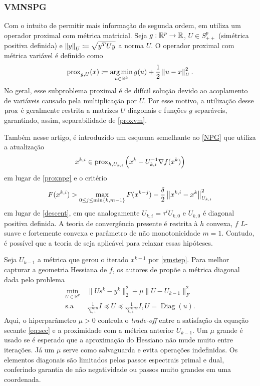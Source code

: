 \subsubsection{VMNSPG}
Com o intuito de permitir mais informação de segunda ordem, em \cite{vmspg} utiliza um operador proximal com métrica matricial. Seja $g:\mathbb{R}^p\to\mathbb{R}$, $U\in S^p_{++}$ (simétrica positiva definida) e $\left\| y \right\|_U\coloneqq\sqrt{y^TUy}$ a norma $U$. O operador proximal com métrica variável é definido como
\begin{equation}
    \label{proxvm}
        \operatorname{prox}_{g,U}(x)\coloneqq\operatorname*{arg\,min}_{u\in\mathbb{R}^k}g(u)+ \frac{1}{2}\left\| u-x \right\|_U^2 . 
\end{equation} 
No geral, esse subproblema proximal é de difícil solução devido ao acoplamento de variáveis causado pela multiplicação por $U$. Por esse motivo, a utilização desse $\operatorname{prox}$ é geralmente restrita a matrizes $U$ diagonais e funções $g$ separáveis, garantindo, assim, separabilidade de \eqref{proxvm}. 

Também nesse artigo, é introduzido um esquema semelhante ao \autoref{NPG} que utiliza a atualização
\begin{equation}
x^{k,i}\in \operatorname{prox}_{h,U_{k,i}}\left(x^k-U_{k,i}^{-1}\nabla f(x^k)\right)\label{vmstep}
\end{equation}            
em lugar de \eqref{proxnpg} e o critério
\[
F(x^{k,i})> \max_{0\leq j \leq \min\{k, m-1\}}F(x^{k-j})-\frac{\delta}{2}\left\| x^{k,i}-x^k \right\|_{U_{k,i}}^2\]
em lugar de \eqref{descent}, em que analogamente $U_{k,i}=\tau^i U_{k,0}$ e $U_{k,0}$ é diagonal positiva definida. A teoria de convergência presente é restrita à $h$ convexa, $f$ $L$-suave e fortemente convexa e parâmetro de não monotonicidade $m=1$. Contudo, é possível que a teoria de \cite{kanzow2021} seja aplicável para relaxar essas hipóteses.

Seja $U_{k-1}$ a métrica que gerou o iterado $x^{k-1}$ por \eqref{vmstep}. Para melhor capturar a geometria Hessiana de $f$, os autores de \cite{vmspg} propõe a métrica diagonal dada pelo problema
\begin{equation}
\begin{aligned}
\min_{U \in \mathbb{R}^p}\ & 
    \|U s^k - y^k\|_2^2 + \mu \|U - U_{k-1}\|_F^2 \\
\text{s.a } 
    & \frac{1}{\gamma^{BBR}_{k,+}} I \preceq U \preceq \frac{1}{\gamma^{BBR2}_{k,+}} I, U = \operatorname{Diag}(u).
\end{aligned}\label{bbmetric}
\end{equation}
Aqui, o hiperparâmetro $\mu > 0$ controla o \textit{trade-off} entre a satisfação da equação secante \eqref{eq:sec} e a proximidade com a métrica anterior $U_{k-1}$. Um $\mu$ grande é usado se é esperado que a aproximação do Hessiano não mude muito entre iterações. Já um $\mu$ serve como salvaguarda e evita operações indefinidas. Os elementos diagonais são limitados pelos passos espectrais primal e dual, conferindo garantia de não negatividade ou passos muito grandes em uma coordenada.

